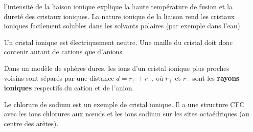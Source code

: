 \documentclass{cours}
\begin{document}
l'intensité de la liaison ionique explique la haute température de fusion et la dureté des cristaux ioniques. La nature ionique de la liaison rend les cristaux ioniques facilement solubles dans les solvants polaires (par exemple dans l'eau).


Un cristal ionique est électriquement neutre. Une maille du cristal doit donc contenir autant de cations que d'anions.

Dans un modèle de sphères dures, les ions d'un cristal ionique plus proches voisins sont séparés par une distance $d=r_+ + r_-$, où $r_+$ et $r_-$ sont les \textbf{rayons ioniques} respectifs du cation et de l'anion.

Le chlorure de sodium est un exemple de cristal ionique. Il a une structure CFC avec les ions chlorures aux n\oe{}uds et les ions sodium sur les sites octaédriques (au centre des arêtes).
\end{document}
